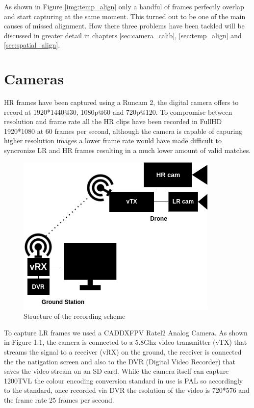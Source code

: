 As shown in Figure \ref{img:temp_align} only a handful of frames perfectly overlap and start capturing at the same moment. This turned out to be one of the main causes of missed alignment.
How there three problems have been tackled will be discussed in greater detail in chapters \ref{sec:camera_calib}, \ref{sec:temp_align} and \ref{sec:spatial_align}.

\section{Cameras}
\label{sec:cameras}

HR frames have been captured using a Runcam 2\cite{runcam}, the digital camera offers to record at 1920*1440@30, 1080p@60 and 720p@120. To compromise between resolution and frame rate all the HR clips have been recorded in FullHD 1920*1080 at 60 frames per second, although the camera is capable of capuring higher resolution images a lower frame rate would have made difficult to syncronize LR and HR frames resulting in a much lower amount of valid matches.
\begin{figure}[h]
  \centering
  \includegraphics[scale=0.5]{figures/recording_schematics_2.png}
  \caption{Structure of the recording scheme}
\end{figure}
To capture LR frames we used a CADDXFPV Ratel2 Analog Camera\cite{caddx}. As shown in Figure 1.1, the camera is connected to a 5.8Ghz video transmitter (vTX) that streams the signal to a receiver (vRX) on the ground, the receiver is connected the the natigation screen and also to the DVR (Digital Video Recorder) that saves the video stream on an SD card. While the camera itself can capture 1200TVL the colour encoding conversion standard in use is PAL\cite{pal} so accordingly to the standard, once recorded via DVR the rsolution of the video is 720*576 and the frame rate 25 frames per second.

